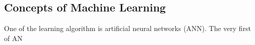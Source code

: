 \subsection{Concepts of Machine Learning}
One of the learning algorithm is artificial neural networks (ANN). The very first of AN
